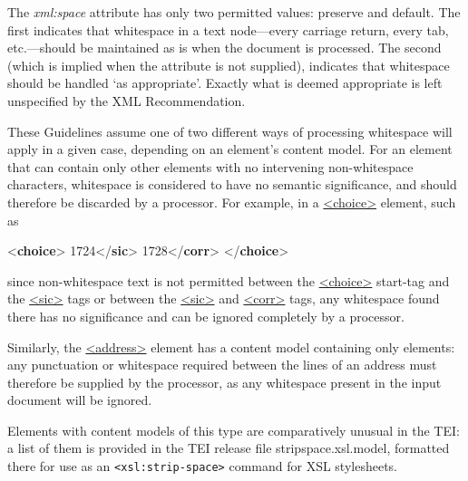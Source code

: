 The {\itshape xml:space} attribute has only two permitted values: preserve and default. The first indicates that whitespace in a text node—every carriage return, every tab, etc.—should be maintained as is when the document is processed. The second (which is implied when the attribute is not supplied), indicates that whitespace should be handled ‘as appropriate’. Exactly what is deemed appropriate is left unspecified by the XML Recommendation.\par
These Guidelines assume one of two different ways of processing whitespace will apply in a given case, depending on an element's content model. For an element that can contain only other elements with no intervening non-whitespace characters, whitespace is considered to have no semantic significance, and should therefore be discarded by a processor. For example, in a \hyperref[TEI.choice]{<choice>} element, such as \par\bgroup{}\exampleFont \begin{shaded}\noindent\mbox{}{<\textbf{choice}>}\mbox{}\newline 
{}1724{</\textbf{sic}>}\mbox{}\newline 
{}1728{</\textbf{corr}>}\mbox{}\newline 
{</\textbf{choice}>}\end{shaded}\egroup\par \noindent  since non-whitespace text is not permitted between the \hyperref[TEI.choice]{<choice>} start-tag and the \hyperref[TEI.sic]{<sic>} tags or between the \hyperref[TEI.sic]{<sic>} and \hyperref[TEI.corr]{<corr>} tags, any whitespace found there has no significance and can be ignored completely by a processor.\par
Similarly, the \hyperref[TEI.address]{<address>} element has a content model containing only elements: any punctuation or whitespace required between the lines of an address must therefore be supplied by the processor, as any whitespace present in the input document will be ignored.\par
Elements with content models of this type are comparatively unusual in the TEI: a list of them is provided in the TEI release file \textsf{stripspace.xsl.model}, formatted there for use as an \texttt{<xsl:strip-space>} command for XSL stylesheets.\par
